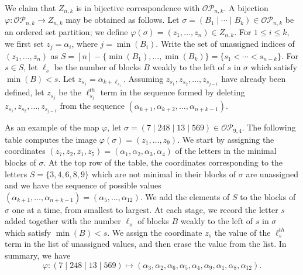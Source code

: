 \documentclass[ALCO,ThmDefs,published]{cedram}
\theoremstyle{plain}
\newcommand{\OP}{{\mathcal{OP}}}
\begin{document}
We claim that $Z_{n,k}$ is in bijective correspondence with $\OP_{n,k}$.  A bijection
$\varphi: \OP_{n,k} \rightarrow Z_{n,k}$ may be obtained as follows.
Let $\sigma = (B_1 \mid \cdots \mid B_k) \in \OP_{n,k}$ be an ordered set partition;
we define $\varphi(\sigma) = (z_1, \dots, z_n) \in Z_{n,k}$.
For $1 \leq i \leq k$, we first set $z_j = \alpha_i$, where $j = \min(B_i)$.  
Write the set of unassigned indices of
$(z_1, \dots, z_n)$ as  $S = [n] - \{\min(B_1), \dots, \min(B_k)\} = \{s_1 < \cdots < s_{n-k} \}$.
For $s \in S$, let $\ell_s$ be the number of blocks $B$ weakly to the left of $s$ in $\sigma$ which 
satisfy $\min(B) < s$.
Let $z_{s_1} = \alpha_{k + \ell_{s_1}}$.  Assuming $z_{s_1}, z_{s_2}, \dots, z_{s_{j-1}}$ have already 
been defined, let $z_{s_j}$ be the $\ell_{s_j}^{th}$ term in the sequence formed by deleting
$z_{s_1}, z_{s_2}, \dots, z_{s_{j-1}}$ from the sequence
$(\alpha_{k+1}, \alpha_{k+2}, \dots, \alpha_{n+k-1})$.


As an example of the map $\varphi$, let $\sigma = (7 \mid 248 \mid 13 \mid 569) \in \OP_{9,4}$.
The following table computes the image $\varphi(\sigma) = (z_1, \dots, z_9)$.
We start by assigning the coordinates $(z_7, z_2, z_1, z_5) = (\alpha_1, \alpha_2, \alpha_3, \alpha_4)$
of the letters in the minimal blocks of $\sigma$.
At the top row of the table, the coordinates corresponding to the letters $S = \{3,4,6,8,9\}$ which are not minimal
in their blocks of $\sigma$ are unassigned and we have the sequence of possible values 
$(\alpha_{k+1}, \dots, \alpha_{n+k-1}) = (\alpha_5, \dots, \alpha_{12})$.
We add the elements of $S$ to the blocks of $\sigma$ one at a time, from smallest to largest.
At each stage, we record the letter $s$ added together with the number $\ell_s$ of blocks $B$
weakly to the left of $s$ in $\sigma$ which satisfy $\min(B) < s$.
We assign the coordinate $z_s$ the value of the $\ell_s^{th}$ term in the list of unassigned values, 
and then erase the value from the list.
In summary, we have
\begin{equation*}
\varphi: ( 7   \mid 2 4 8  \mid 1 3  \mid 5 6 9) \mapsto 
(\alpha_3, \alpha_2,  \alpha_6,  \alpha_5 , \alpha_4, \alpha_9, \alpha_1,  \alpha_8, \alpha_{12}).
\end{equation*}
\end{document}
